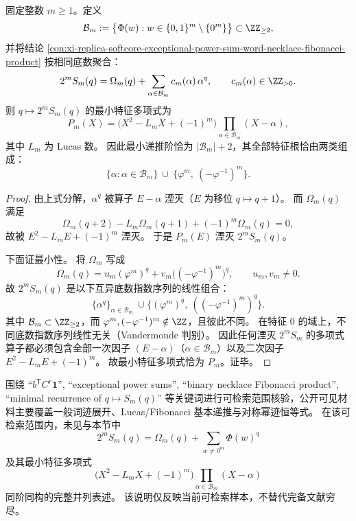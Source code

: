 \begin{conclusion}\label{con:xi-replica-softcore-fixed-m-q-minimal-recurrence}
固定整数 \(m\ge 1\)。定义
\[
\mathcal B_m:=\bigl\{\Phi(w):w\in\{0,1\}^m\setminus\{0^m\}\bigr\}\subset\ZZ_{\ge 2},
\]
并将结论 \ref{con:xi-replica-softcore-exceptional-power-sum-word-necklace-fibonacci-product} 按相同底数聚合：
\[
2^mS_m(q)=\Omega_m(q)+\sum_{\alpha\in\mathcal B_m}c_m(\alpha)\,\alpha^q,
\qquad c_m(\alpha)\in\ZZ_{>0}.
\]
则 \(q\mapsto 2^mS_m(q)\) 的最小特征多项式为
\[
\boxed{
P_m(X)=\bigl(X^2-L_mX+(-1)^m\bigr)\prod_{\alpha\in\mathcal B_m}(X-\alpha),
}
\]
其中 \(L_m\) 为 Lucas 数。
因此最小递推阶恰为 \(|\mathcal B_m|+2\)，其全部特征根恰由两类组成：
\[
\{\alpha:\alpha\in\mathcal B_m\}\ \cup\ \{\varphi^m,\ (-\varphi^{-1})^m\}.
\]
\end{conclusion}
\begin{proof}
由上式分解，\(\alpha^q\) 被算子 \(E-\alpha\) 湮灭（\(E\) 为移位 \(q\mapsto q+1\)）。
而 \(\Omega_m(q)\) 满足
\[
\Omega_m(q+2)-L_m\Omega_m(q+1)+(-1)^m\Omega_m(q)=0,
\]
故被 \(E^2-L_mE+(-1)^m\) 湮灭。
于是 \(P_m(E)\) 湮灭 \(2^mS_m(q)\)。

下面证最小性。
将 \(\Omega_m\) 写成
\[
\Omega_m(q)=u_m(\varphi^m)^q+v_m\bigl((-\varphi^{-1})^m\bigr)^q,
\qquad
u_m,v_m\neq 0.
\]
故 \(2^mS_m(q)\) 是以下互异底数指数序列的线性组合：
\[
\{\alpha^q\}_{\alpha\in\mathcal B_m}\ \cup
\{(\varphi^m)^q,\ ((-\varphi^{-1})^m)^q\}.
\]
其中 \(\mathcal B_m\subset\ZZ_{\ge 2}\)，而 \(\varphi^m,(-\varphi^{-1})^m\notin\ZZ\)，且彼此不同。
在特征 \(0\) 的域上，不同底数指数序列线性无关（Vandermonde 判别）。
因此任何湮灭 \(2^mS_m\) 的多项式算子都必须包含全部一次因子
\((E-\alpha)\)（\(\alpha\in\mathcal B_m\)）以及二次因子
\(E^2-L_mE+(-1)^m\)。
故最小特征多项式恰为 \(P_m\)。证毕。
\end{proof}

\begin{remark}[可检索范围核验说明]\label{rem:xi-replica-softcore-fib-word-necklace-search-scope}
围绕 “\(b^{\mathsf T}C^r\mathbf1\)”, “exceptional power sums”, “binary necklace Fibonacci product”, “minimal recurrence of \(q\mapsto S_m(q)\)” 等关键词进行可检索范围核验，公开可见材料主要覆盖一般词迹展开、Lucas/Fibonacci 基本递推与对称幂迹恒等式。
在该可检索范围内，未见与本节中
\[
2^mS_m(q)=\Omega_m(q)+\sum_{w\neq 0^m}\Phi(w)^q
\]
及其最小特征多项式
\[
\bigl(X^2-L_mX+(-1)^m\bigr)\prod_{\alpha\in\mathcal B_m}(X-\alpha)
\]
同阶同构的完整并列表述。
该说明仅反映当前可检索样本，不替代完备文献穷尽。
\end{remark}

\endinput
